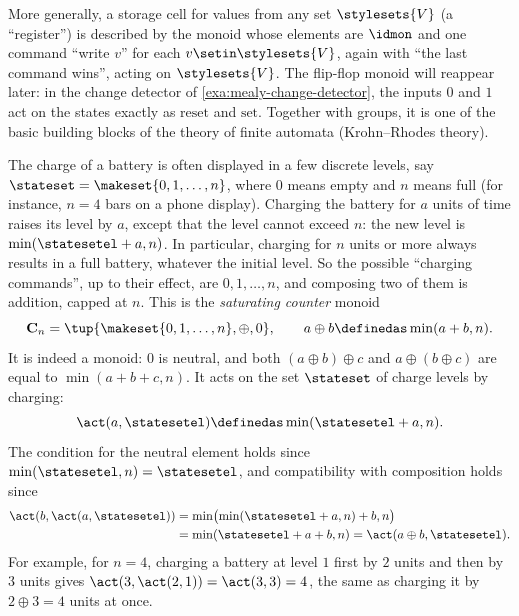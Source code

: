 \begin{example}
    More generally, a storage cell for values from any set $\stylesets{V}$ (a ``register'') is described by the monoid whose elements are $\idmon$ and one command ``write $v$'' for each $v \setin \stylesets{V}$, again with ``the last command wins'', acting on $\stylesets{V}$.
    The flip-flop monoid will reappear later: in the change detector of \cref{exa:mealy-change-detector}, the inputs $0$ and $1$ act on the states exactly as $\text{reset}$ and $\text{set}$.
    Together with groups, it is one of the basic building blocks of the theory of finite automata (Krohn--Rhodes theory).
\end{example}

\begin{example}
    \label{exa:saturating-counter}
    The charge of a battery is often displayed in a few discrete levels, say $\stateset = \makeset{0, 1, \dots, n}$, where $0$ means empty and $n$ means full (for instance, $n = 4$ bars on a phone display).
    Charging the battery for $a$ units of time raises its level by $a$, except that the level cannot exceed $n$: the new level is $\min(\statesetel + a, n)$.
    In particular, charging for $n$ units or more always results in a full battery, whatever the initial level.
    So the possible ``charging commands'', up to their effect, are $0, 1, \dots, n$, and composing two of them is addition, capped at $n$.
    This is the \emph{saturating counter} monoid
    \begin{equation}
        \mathbf{C}_n = \tup{\makeset{0, 1, \dots, n}, \oplus, 0}, \qquad a \oplus b \definedas \min(a + b, n).
    \end{equation}
    It is indeed a monoid: $0$ is neutral, and both $(a \oplus b) \oplus c$ and $a \oplus (b \oplus c)$ are equal to $\min(a + b + c, n)$.
    It acts on the set $\stateset$ of charge levels by charging:
    \begin{equation}
        \act(a, \statesetel) \definedas \min(\statesetel + a, n).
    \end{equation}
    The condition for the neutral element holds since $\min(\statesetel, n) = \statesetel$, and compatibility with composition holds since
    \begin{equation}
        \begin{aligned}
            \act(b, \act(a, \statesetel))
            & = \min\bigl(\min(\statesetel + a, n) + b, n\bigr) \\
            & = \min(\statesetel + a + b, n) = \act(a \oplus b, \statesetel).
        \end{aligned}
    \end{equation}
    For example, for $n = 4$, charging a battery at level $1$ first by $2$ units and then by $3$ units gives $\act(3, \act(2, 1)) = \act(3, 3) = 4$, the same as charging it by $2 \oplus 3 = 4$ units at once.


\end{example}
